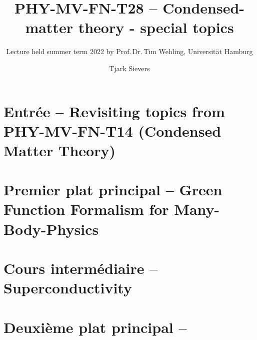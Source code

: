 \documentclass[a4paper, twoside]{scrbook}
\begin{document}
\title{PHY-MV-FN-T28 -- Condensed-matter theory - special topics}
\author{Tjark Sievers}
\subtitle{Lecture held summer term 2022 by Prof.\,Dr.\,Tim Wehling, Universität Hamburg}
\date{}
\maketitle

\part{Entrée -- Revisiting topics from PHY-MV-FN-T14 (Condensed Matter Theory)} 




\part{Premier plat principal -- Green Function Formalism for Many-Body-Physics} 





\part{Cours intermédiaire -- Superconductivity}



\part{Deuxième plat principal -- }




\end{document}

